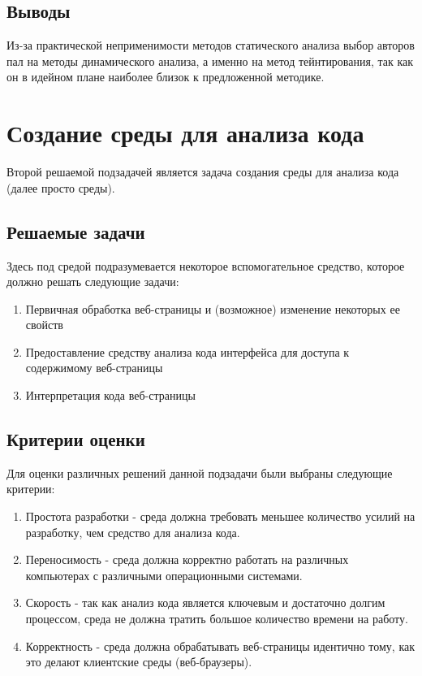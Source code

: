 \subsection{Выводы}
	Из-за практической неприменимости методов статического анализа выбор авторов пал на методы динамического анализа, а именно на метод тейнтирования, так как он в идейном плане наиболее близок к предложенной методике.


\section{Создание среды для анализа кода}
Второй решаемой подзадачей является задача создания среды для анализа кода (далее просто среды).

\subsection{Решаемые задачи}
	Здесь под средой подразумевается некоторое вспомогательное средство, которое должно решать следующие задачи:

	\begin{enumerate}
		\item Первичная обработка веб-страницы и (возможное) изменение некоторых ее свойств
		\item Предоставление средству анализа кода интерфейса для доступа к содержимому веб-страницы
		\item Интерпретация кода веб-страницы
	\end{enumerate}

\subsection{Критерии оценки}
	Для оценки различных решений данной подзадачи были выбраны следующие критерии:

	\begin{enumerate}
		\item Простота разработки - среда должна требовать меньшее количество усилий на разработку, чем средство для анализа кода.
		\item Переносимость - среда должна корректно работать на различных компьютерах с различными операционными системами.
		\item Скорость - так как анализ кода является ключевым и достаточно долгим процессом, среда не должна тратить большое количество времени на работу.
		\item Корректность - среда должна обрабатывать веб-страницы идентично тому, как это делают клиентские среды (веб-браузеры).
	\end{enumerate}
	\bigskip

